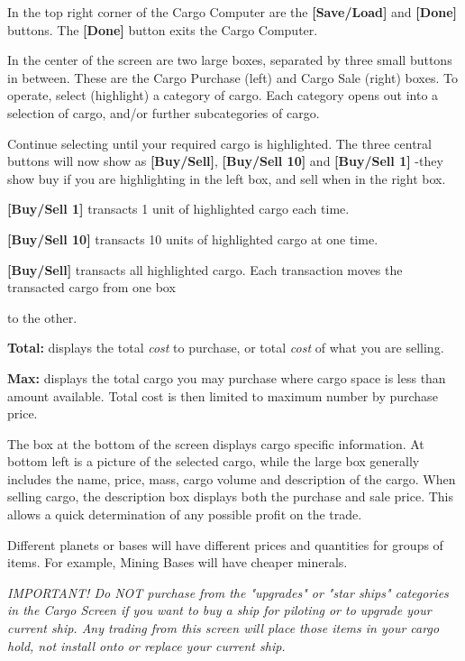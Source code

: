 \documentclass{article}
\begin{document}
In the top right corner of the Cargo Computer are the \textbf{[Save/Load] }and \textbf{[Done] }buttons. The \textbf{[Done] }button exits the Cargo Computer. 

In the center of the screen are two large boxes, separated by three small buttons in between. These are the Cargo Purchase (left) and Cargo Sale (right) boxes. To operate, select (highlight) a category of cargo. Each category opens out into a selection of cargo, and/or further subcategories of cargo. 

Continue selecting until your required cargo is highlighted. The three central buttons will now show as \textbf{[Buy/Sell]}, \textbf{[Buy/Sell 10] }and \textbf{[Buy/Sell 1] }-they show buy if you are highlighting in the left box, and sell when in the right box.

\textbf{[Buy/Sell 1] }transacts 1 unit of highlighted cargo each time.

\textbf{[Buy/Sell 10] }transacts 10 units of highlighted cargo at one time.

\textbf{[Buy/Sell] }transacts all highlighted cargo. Each transaction moves the transacted cargo from one box 

to the other. 

\textbf{Total: }displays the total \textit{cost }to purchase, or total \textit{cost }of what you are selling. 

\textbf{Max: }displays the total cargo you may purchase where cargo space is less than amount available. Total cost is then limited to maximum number by purchase price. 



The box at the bottom of the screen displays cargo specific information. At bottom left is a picture of the selected cargo, while the large box generally includes the name, price, mass, cargo volume and description of the cargo. When selling cargo, the description box displays both the purchase and sale price. This allows a quick determination of any possible profit on the trade. 

Different planets or bases will have different prices and quantities for groups of items. For example, Mining Bases will have cheaper minerals. 

\textit{IMPORTANT! Do NOT purchase from the "upgrades" or "star ships" categories in the Cargo Screen if you want to buy a ship for piloting or to upgrade your current ship. Any trading from this screen will place those items in your cargo hold, not install onto or replace your current ship. }
\end{document}
